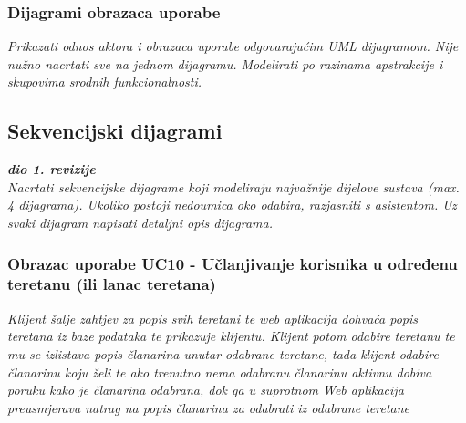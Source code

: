 					
				\subsubsection{Dijagrami obrazaca uporabe}
					
					\textit{Prikazati odnos aktora i obrazaca uporabe odgovarajućim UML dijagramom. Nije nužno nacrtati sve na jednom dijagramu. Modelirati po razinama apstrakcije i skupovima srodnih funkcionalnosti.}
				\eject		
				
			\subsection{Sekvencijski dijagrami}
				
				\textbf{\textit{dio 1. revizije}}\\
				
				\textit{Nacrtati sekvencijske dijagrame koji modeliraju najvažnije dijelove sustava (max. 4 dijagrama). Ukoliko postoji nedoumica oko odabira, razjasniti s asistentom. Uz svaki dijagram napisati detaljni opis dijagrama.}
				
					\subsubsection{Obrazac uporabe UC10 - Učlanjivanje korisnika u određenu teretanu (ili lanac teretana)}
					\textit{Klijent šalje zahtjev za popis svih teretani te web aplikacija dohvaća popis teretana
                    iz baze podataka te prikazuje klijentu. Klijent potom odabire teretanu te mu se izlistava
                    popis članarina unutar odabrane teretane, tada klijent odabire članarinu koju želi te 
                    ako trenutno nema odabranu članarinu aktivnu dobiva poruku kako je članarina odabrana, 
                    dok ga u suprotnom Web aplikacija preusmjerava natrag na popis članarina za odabrati
                    iz odabrane teretane}\\
                    
